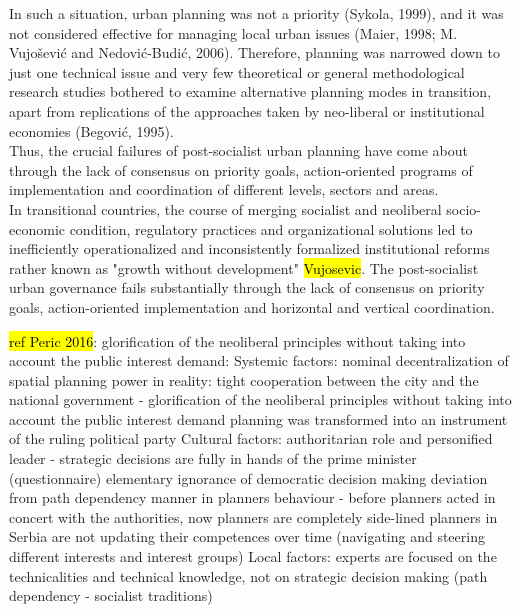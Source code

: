 \documentclass[11pt]{report}
\begin{document}
In such a situation, urban planning was not a priority (Sykola, 1999), and it was not considered effective for managing local urban issues (Maier, 1998; M. Vujošević and Nedović-Budić, 2006). Therefore, planning was narrowed down to just one technical issue and very few theoretical or general methodological research studies bothered to examine alternative planning modes in transition, apart from replications of the approaches taken by neo-liberal or institutional economies (Begović, 1995).
\\
Thus, the crucial failures of post-socialist urban planning have come about through the lack of consensus on priority goals, action-oriented programs of implementation and coordination of different levels, sectors and areas. 
\\
In transitional countries, the course of merging socialist and neoliberal socio-economic condition, regulatory practices and organizational solutions led to inefficiently operationalized and inconsistently formalized institutional reforms rather known as "growth without development" \hl{Vujosevic}.
The post-socialist urban governance fails substantially through the lack of consensus on priority goals, action-oriented implementation and horizontal and vertical coordination.
\\

\hl{ref Peric 2016}:
glorification of the neoliberal principles without taking into account the public interest demand:
    Systemic factors:
nominal decentralization of spatial planning power
in reality: tight cooperation between the city and the national government - 
glorification of the neoliberal principles without taking into account the public interest demand
planning was transformed into an instrument of the ruling political party
    Cultural factors:
authoritarian role and personified leader - strategic decisions are fully in hands of the prime minister (questionnaire)
elementary ignorance of democratic decision making
deviation from path dependency manner in planners behaviour -  before planners acted in concert with the authorities, now planners are completely side-lined
planners in Serbia are not updating their competences over time (navigating and steering different interests and interest groups)
    Local factors:
experts are focused on the technicalities and technical knowledge, not on strategic decision making (path dependency - socialist traditions)
\end{document}
